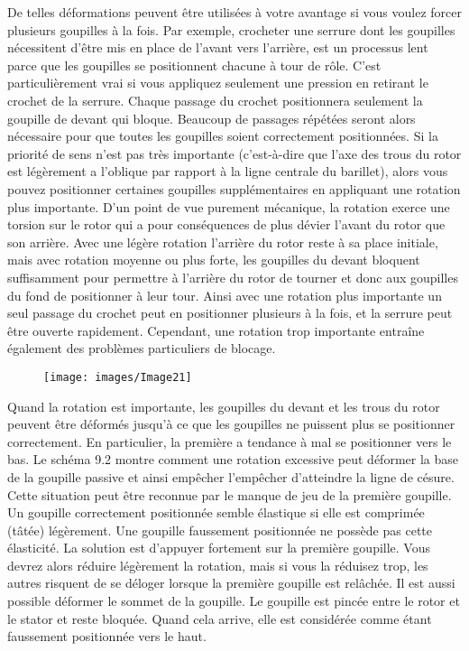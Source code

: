 \documentclass[a4paper,french,11pt,twoside]{report}
\begin{document}
De telles déformations peuvent être utilisées à votre avantage si vous voulez forcer plusieurs goupilles à la fois. Par exemple, crocheter une serrure dont les goupilles nécessitent d'être mis en place de l'avant vers l'arrière, est un processus lent parce que les goupilles se positionnent chacune à tour de rôle. C'est particulièrement vrai si vous appliquez seulement une pression en retirant le crochet de la serrure. Chaque passage du crochet positionnera seulement la goupille de devant qui bloque. Beaucoup de passages répétées seront alors nécessaire pour que toutes les goupilles soient correctement positionnées. Si la priorité de sens n'est pas très importante (c'est-à-dire que l'axe des trous du rotor est légèrement a l'oblique par rapport à la ligne centrale du barillet), alors vous pouvez positionner certaines goupilles supplémentaires en appliquant une rotation plus importante. D'un point de vue purement mécanique, la rotation exerce une torsion sur le rotor qui a pour conséquences de plus dévier l'avant du rotor que son arrière. Avec une légère rotation l'arrière du rotor reste à sa place initiale, mais avec rotation moyenne ou plus forte, les goupilles du devant bloquent suffisamment pour permettre à l'arrière du rotor de tourner et donc aux goupilles du fond de positionner à leur tour. Ainsi avec une rotation plus importante un seul passage du crochet peut en positionner plusieurs à la fois, et la serrure peut être ouverte rapidement. Cependant, une rotation trop importante entraîne également des problèmes particuliers de blocage.

\begin{figure}[ht] \begin{center}
        \texttt{[image: images/Image21]}
        \caption{}
\end{center} \end{figure}


Quand la rotation est importante, les goupilles du devant et les trous du rotor peuvent être déformés jusqu'à ce que les goupilles ne puissent plus se positionner correctement. En particulier, la première a tendance à mal se positionner vers le bas. Le schéma 9.2 montre comment une rotation excessive peut déformer la base de la goupille passive et ainsi empêcher l'empêcher d'atteindre la ligne de césure. Cette situation peut être reconnue par le manque de jeu de la première goupille. Un goupille correctement positionnée semble élastique si elle est comprimée (tâtée) légèrement. Une goupille faussement positionnée ne possède pas cette élasticité. La solution est d'appuyer fortement sur la première goupille. Vous devrez alors réduire légèrement la rotation, mais si vous la réduisez trop, les autres risquent de se déloger lorsque la première goupille est relâchée. Il est aussi possible déformer le sommet de la goupille. Le goupille est pincée entre le rotor et le stator et reste bloquée. Quand cela arrive, elle est considérée comme étant faussement positionnée vers le haut.
\end{document}
